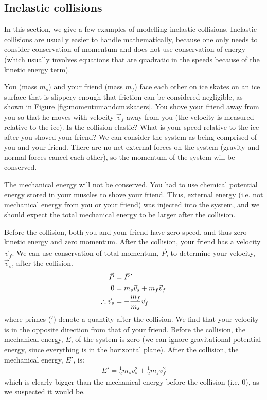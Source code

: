\subsection{Inelastic collisions}
In this section, we give a few examples of modelling inelastic collisions. Inelastic collisions are usually easier to handle mathematically, because one only needs to consider conservation of momentum and does not use conservation of energy (which usually involves equations that are quadratic in the speeds because of the kinetic energy term).
\begin{example}{
You (mass $m_s$) and your friend (mass $m_f$) face each other on ice skates on an ice surface that is slippery enough that friction can be considered negligible, as shown in Figure \ref{fig:momentumandcm:skaters}. You shove your friend away from you so that he moves with velocity $\vec v_f$ away from you (the velocity is measured relative to the ice). Is the collision elastic? What is your speed relative to the ice after you shoved your friend?}
We can consider the system as being comprised of you and your friend. There are no net external forces on the system (gravity and normal forces cancel each other), so the momentum of the system will be conserved. 

The mechanical energy will not be conserved. You had to use chemical potential energy stored in your muscles to shove your friend. Thus, external energy (i.e. not mechanical energy from you or your friend) was injected into the system, and we should expect the total mechanical energy to be larger after the collision. 

Before the collision, both you and your friend have zero speed, and thus zero kinetic energy and zero momentum. After the collision, your friend has a velocity $\vec v_f$. We can use conservation of total momentum, $\vec P$, to determine your velocity, $\vec v_s$, after the collision. 
\begin{align*}
\vec P &=\pvec P'\\
0 &= m_s\vec v_s + m_f\vec v_f\\
\therefore \vec v_s &= -\frac{m_f}{m_s}\vec v_f
\end{align*}
where primes ($'$) denote a quantity after the collision. We find that your velocity is in the opposite direction from that of your friend. Before the collision, the mechanical energy, $E$, of the system is zero (we can ignore gravitational potential energy, since everything is in the horizontal plane). After the collision, the mechanical energy, $E'$, is:
\begin{align*}
E' = \frac{1}{2}m_sv_s^2+\frac{1}{2}m_fv_f^2
\end{align*}
which is clearly bigger than the mechanical energy before the collision (i.e. 0), as we suspected it would be.


\end{example}
